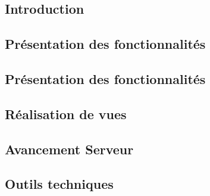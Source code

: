 

\subsection{Introduction}


\subsection{Présentation des fonctionnalités}


\subsection{Présentation des fonctionnalités}




\subsection{Réalisation de vues}


\subsection{Avancement Serveur}


\subsection{Outils techniques}


